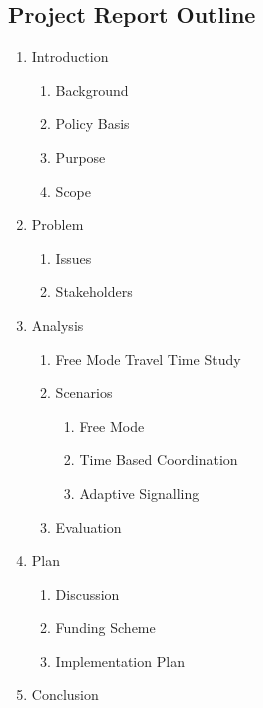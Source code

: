 \newpage
{}
\begin{appendices}


\section{Project Report Outline}
\begin{enumerate}
\item Introduction
	\begin{enumerate}
	\item Background
	\item Policy Basis
	\item Purpose
	\item Scope
	\end{enumerate}
\item Problem
	\begin{enumerate}
	\item Issues
	\item Stakeholders
	\end{enumerate}
\item Analysis
	\begin{enumerate}
	\item Free Mode Travel Time Study
	\item Scenarios
		\begin{enumerate}
		\item Free Mode
		\item Time Based Coordination
		\item Adaptive Signalling
		\end{enumerate}
	\item Evaluation
	\end{enumerate}
\item Plan 
	\begin{enumerate}
	\item Discussion
	\item Funding Scheme
	\item Implementation Plan
	\end{enumerate}
\item Conclusion
\end{enumerate}

\end{appendices}



